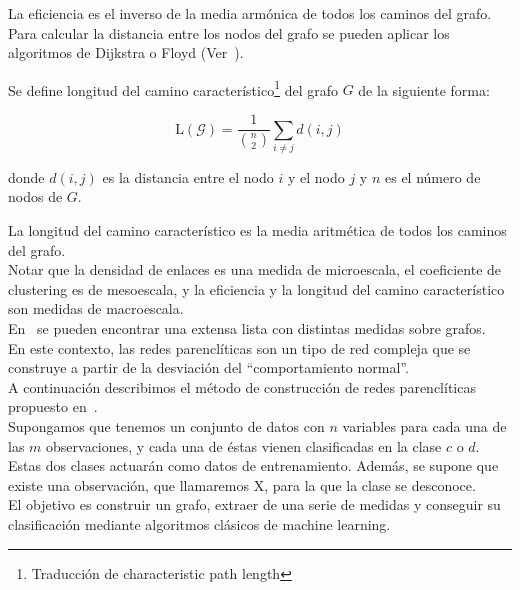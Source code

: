 La eficiencia es el inverso de la media armónica de todos los caminos del grafo.\\

Para calcular la distancia entre los nodos del grafo se pueden aplicar los algoritmos de Dijkstra o Floyd (Ver~\cite{Cormen:2001:IA:580470}).

\begin{defi}
	Se define longitud del camino característico\footnote{Traducción de characteristic path length} del grafo $G$ de la siguiente forma:
	
	\begin{equation}\label{eq:camino}
	\mathrm{L}(\mathcal{G}) = \dfrac{1}{\binom{n}{2}} \sum_{i\neq j} d(i,j)
	\end{equation}
	
	donde $d(i,j)$ es la distancia entre el nodo $i$ y el nodo $j$ y $n$ es el número de nodos de $G$.
\end{defi}

La longitud del camino característico es la media aritmética de todos los caminos del grafo.\\

Notar que la densidad de enlaces es una medida de microescala, el coeficiente de clustering es de mesoescala, y la eficiencia y la longitud del camino característico son medidas de macroescala.\\

En~\cite{cond-mat/0505185} se pueden encontrar una extensa lista con distintas medidas sobre grafos.\\

En este contexto, las redes parenclíticas son un tipo de red compleja que se construye a partir de la desviación del ``comportamiento normal''.\\

A continuación describimos el método de construcción de redes parenclíticas propuesto en~\cite{metabo3010155}.\\

Supongamos que tenemos un conjunto de datos con $n$ variables para cada una de las $m$ observaciones, y cada una de éstas vienen clasificadas en la clase $c$ o $d$. Estas dos clases actuarán como datos de entrenamiento. Además, se supone que existe una observación, que llamaremos X, para la que la clase se desconoce.\\

El objetivo es construir un grafo, extraer de una serie de medidas y conseguir su clasificación mediante algoritmos clásicos de machine learning.\\

